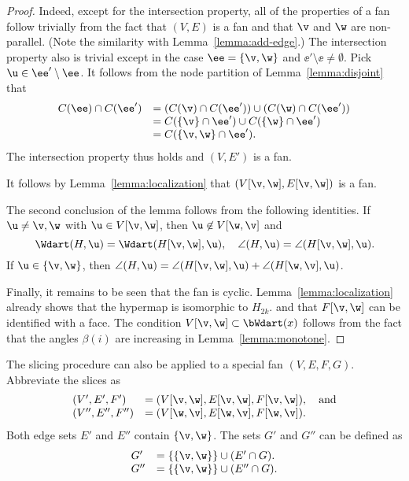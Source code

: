 \begin{proof} 
Indeed, except for the intersection property, all of the properties
of a fan follow trivially from the fact that $(V,E)$ is a fan and
that $\v$ and $\w$ are non-parallel.  (Note the similarity with
Lemma~\ref{lemma:add-edge}.)  The intersection property also is
trivial except in the case $\ee=\{\v,\w\}$ and $\ee'\setminus \ee\ne
\emptyset$.  Pick $\u\in \ee'\setminus\ee$.  It follows from the
node partition of Lemma~\ref{lemma:disjoint} that
\begin{displaymath}
\begin{array}{lll}
C(\ee) \cap C(\ee') &= (C(\v) \cap C(\ee')) \cup (C(\w)\cap C(\ee')) \\
&= C(\{\v\}\cap \ee') \cup C(\{\w\}\cap \ee') \\
&= C(\{\v,\w\}\cap \ee').
\end{array}
\end{displaymath}
The intersection property thus holds and $(V,E')$ is a fan.

It follows by Lemma~\ref{lemma:localization} that
$(V[\v,\w],E[\v,\w])$ is a fan.

The second conclusion of the lemma follows from the following identities.
If $\u\ne \v,\w$ with $\u\in V[\v,\w]$, then $\u\not\in V[\w,\v]$ and 
\begin{equation}
\Wdart(H,\u)=\Wdart(H[\v,\w],\u),\quad \angle(H,\u) = \angle(H[\v,\w],\u).
\end{equation}
If $\u\in\{\v,\w\}$, then 
$\angle(H,\u)=\angle(H[\v,\w],\u) +\angle(H[\w,\v],\u)$.

Finally, it remains to be seen that the fan is cyclic.
Lemma~\ref{lemma:localization} already shows that the hypermap is
isomorphic to $H_{2k}$. and that $F[\v,\w]$ can be identified with a
face.  The condition $V[\v,\w]\subset \bWdart(x)$ follows from the
fact that the angles $\beta(i)$ are increasing in
Lemma~\ref{lemma:monotone}.
\end{proof}



The slicing procedure can also be applied to a special fan $(V,E,F,G)$.
Abbreviate the slices as
\begin{displaymath}
\begin{array}{lll}
(V',E',F')&=(V[\v,\w],E[\v,\w],F[\v,\w]),\quad\text{and}\\
(V'',E'',F'')&= (V[\w,\v],E[\w,\v],F[\w,\v]).
\end{array}
\end{displaymath}
Both edge sets $E'$ and $E''$ contain $\{\v,\w\}$.  The sets $G'$ and
$G''$ can be defined as
\begin{displaymath}
\begin{array}{lll}
G' &= \{\{\v,\w\}\} \cup (E'\cap G).\\
G'' &= \{\{\v,\w\}\} \cup (E''\cap G).\\
\end{array}
\end{displaymath} 


